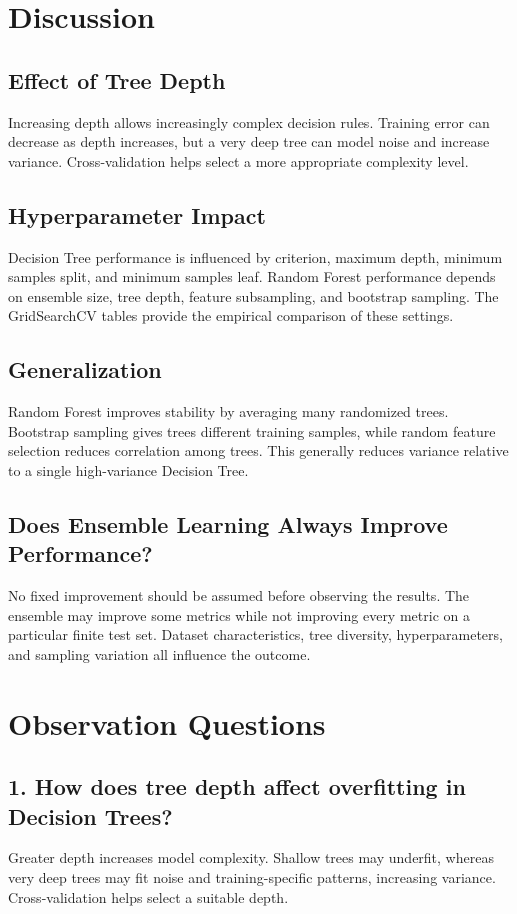 \documentclass[12pt,a4paper]{article}
\begin{document}
\section{Discussion}
\subsection{Effect of Tree Depth}
Increasing depth allows increasingly complex decision rules. Training error can decrease as depth increases, but a very deep tree can model noise and increase variance. Cross-validation helps select a more appropriate complexity level.

\subsection{Hyperparameter Impact}
Decision Tree performance is influenced by criterion, maximum depth, minimum samples split, and minimum samples leaf. Random Forest performance depends on ensemble size, tree depth, feature subsampling, and bootstrap sampling. The GridSearchCV tables provide the empirical comparison of these settings.

\subsection{Generalization}
Random Forest improves stability by averaging many randomized trees. Bootstrap sampling gives trees different training samples, while random feature selection reduces correlation among trees. This generally reduces variance relative to a single high-variance Decision Tree.

\subsection{Does Ensemble Learning Always Improve Performance?}
No fixed improvement should be assumed before observing the results. The ensemble may improve some metrics while not improving every metric on a particular finite test set. Dataset characteristics, tree diversity, hyperparameters, and sampling variation all influence the outcome.

\section{Observation Questions}
\subsection*{1. How does tree depth affect overfitting in Decision Trees?}
Greater depth increases model complexity. Shallow trees may underfit, whereas very deep trees may fit noise and training-specific patterns, increasing variance. Cross-validation helps select a suitable depth.
\end{document}
